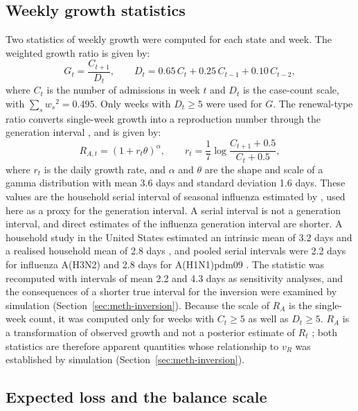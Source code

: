 \subsection{Weekly growth statistics}
\label{sec:meth-stats}

Two statistics of weekly growth were computed for each state and week. The weighted growth ratio is given by:
\begin{equation}
  G_t=\frac{C_{t+1}}{D_t},\qquad D_t=0.65\,C_t+0.25\,C_{t-1}+0.10\,C_{t-2},
  \label{eq:dt}
\end{equation}
where $C_t$ is the number of admissions in week $t$ and $D_t$ is the case-count scale, with $\sum_sw_s{}^2=0.495$. Only weeks with $D_t\ge5$ were used for $G$. The renewal-type ratio converts single-week growth into a reproduction number through the generation interval \citep{wallinga2007how}, and is given by:
\begin{equation}
  R_{A,t}=\left(1+r_t\theta\right)^{\alpha},\qquad r_t=\frac{1}{7}\log\frac{C_{t+1}+0.5}{C_t+0.5},
  \label{eq:ra}
\end{equation}
where $r_t$ is the daily growth rate, and $\alpha$ and $\theta$ are the shape and scale of a gamma distribution with mean 3.6 days and standard deviation 1.6 days. These values are the household serial interval of seasonal influenza estimated by \citet{cowling2009estimation}, used here as a proxy for the generation interval. A serial interval is not a generation interval, and direct estimates of the influenza generation interval are shorter. A household study in the United States estimated an intrinsic mean of 3.2 days and a realised household mean of 2.8 days \citep{chan2025estimating}, and pooled serial intervals were 2.2 days for influenza A(H3N2) and 2.8 days for A(H1N1)pdm09 \citep{vink2014serial}. The statistic was recomputed with intervals of mean 2.2 and 4.3 days as sensitivity analyses, and the consequences of a shorter true interval for the inversion were examined by simulation (Section~\ref{sec:meth-inversion}). Because the scale of $R_A$ is the single-week count, it was computed only for weeks with $C_t\ge5$ as well as $D_t\ge5$. $R_A$ is a transformation of observed growth and not a posterior estimate of $R_t$ \citep{cori2013new}; both statistics are therefore apparent quantities whose relationship to $v_R$ was established by simulation (Section~\ref{sec:meth-inversion}).

\subsection{Expected loss and the balance scale}
\label{sec:meth-loss}

